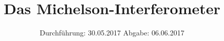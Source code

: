 

\subject{VERSUCH 403}
\title{Das Michelson-Interferometer}
\date{
  Durchführung: 30.05.2017
  \hspace{3em}
  Abgabe: 06.06.2017
}



\maketitle
\thispagestyle{empty}
\tableofcontents
\newpage






\printbibliography


